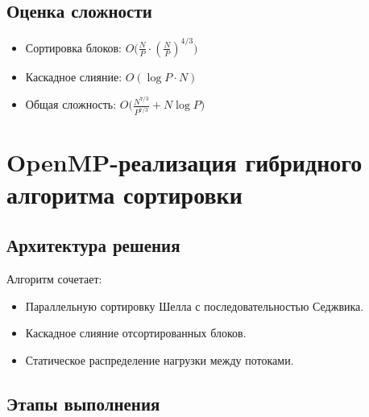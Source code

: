 \documentclass[a4paper,14pt]{extarticle}
\begin{document}
\subsection*{Оценка сложности}

\begin{itemize}
    \item Сортировка блоков: $O\big(\frac{N}{P} \cdot (\frac{N}{P})^{4/3}\big)$
    \item Каскадное слияние: $O(\log P \cdot N)$
    \item Общая сложность: $O\big(\frac{N^{7/3}}{P^{7/3}} + N\log P\big)$
\end{itemize}

\newpage

\section*{OpenMP-реализация гибридного алгоритма сортировки}

\subsection*{Архитектура решения}
Алгоритм сочетает:
\begin{itemize}[leftmargin=*]
    \item Параллельную сортировку Шелла с последовательностью Седжвика.
    \item Каскадное слияние отсортированных блоков.
    \item Статическое распределение нагрузки между потоками.
\end{itemize}

\subsection*{Этапы выполнения}
\end{document}
